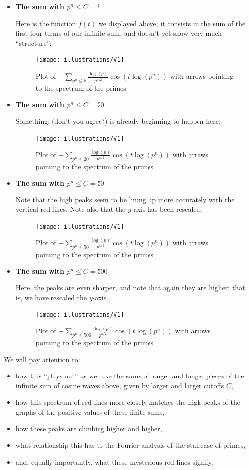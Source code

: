 \documentclass[openany]{book}
\newcommand{\ill}[3]{%
   \begin{figure}[H]%
   \vspace{-2ex}
   \centering%
   \texttt{[image: illustrations/\#1]}%
   \caption{#3}%
   \vspace{-2ex}
    \end{figure}}
\theoremstyle{plain}
\theoremstyle{definition}
\begin{document}
\begin{enumerate}
\begin{itemize}
\item {\bf The sum with $p^n \le C=5$}

Here is the function $f(t)$ we displayed above; it consists in the sum of the first four terms of our infinite sum, and doesn't yet show very much ``structure'':

\ill{phihat_even-5}{1}{Plot of $-\sum_{p^n\leq 5}{\frac{\log(p)}{p^{n/2}}}\cos(t\log(p^n))$ with
arrows pointing to the spectrum of the primes\label{fig:pnsum5}}

\vskip20pt
\item {\bf The sum with $p^n \le C=20$}

 Something,
 (don't you agree?)  is already beginning to happen here:
\ill{phihat_even-20}{1}{Plot of $-\sum_{p^n\leq 20}{\frac{\log(p)}{p^{n/2}}}\cos(t\log(p^n))$ with arrows pointing to the spectrum of the primes}\vskip20pt
\item {\bf The sum with $p^n \le C=50$}

  Note that the high peaks seem to be lining up more accurately with
  the vertical red lines. Note also that the $y$-axis has been
  rescaled.

\ill{phihat_even-50}{1}{Plot of $-\sum_{p^n\leq 50}{\frac{\log(p)}{p^{n/2}}}\cos(t\log(p^n))$ with arrows pointing to the spectrum of the primes}\vskip20pt
\item {\bf The sum with $p^n \le C=500$}

  Here, the peaks are even sharper, and note that again they are
  higher; that is, we have rescaled the $y$-axis.
  \ill{phihat_even-500}{1}{Plot of $-\sum_{p^n\leq
      500}{\frac{\log(p)}{p^{n/2}}}\cos(t\log(p^n))$ with arrows
    pointing to the spectrum of the primes\label{fig:pnsum500}}
\end{itemize}

  We will pay attention to:

\begin{itemize}
\item how this ``plays out'' as we take the sums of longer and longer
  pieces of the infinite sum of cosine waves above, given by larger
  and larger cutoffs $C$,
\item how this spectrum of red lines more closely matches the high
  peaks of the graphs of the positive values of these finite sums,
\item how these peaks are climbing higher and higher,
\item what relationship this has to the Fourier analysis of the
  staircase of primes,
\item and, equally importantly, what these mysterious red lines
  signify.
\end{itemize}


\end{enumerate}
\end{document}
